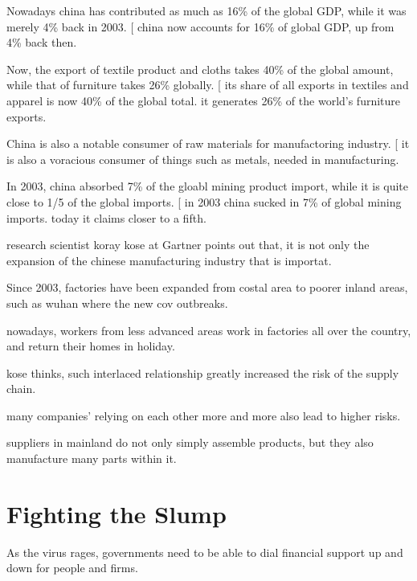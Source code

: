 \documentclass[a4paper,10pt]{article}
\begin{document}
{{{{{{{Nowadays china has contributed as much as 16\% of the global GDP, while it was merely 4\% back in 2003.
[
	china now accounts for 16\% of global GDP, up from 4\% back then.

Now, the export of textile product and cloths takes 40\% of the global amount, while that of furniture takes 26\% globally.
[
	its share of all exports in textiles and apparel is now 40\% of the global total.
	it generates 26\% of the world's furniture exports.

China is also a notable consumer of raw materials for manufactoring industry.
[
	it is also a voracious consumer of things such as metals, needed in manufacturing.

In 2003, china absorbed 7\% of the gloabl mining product import, while it is quite close to 1/5 of the global imports.
[
	in 2003 china sucked in 7\% of global mining imports. today it claims closer to a fifth.

%

research scientist koray kose at Gartner points out that, it is not only the expansion of the chinese manufacturing industry that is importat.

Since 2003, factories have been expanded from costal area to poorer inland areas, such as wuhan where the new cov outbreaks.

nowadays, workers from less advanced areas work in factories all over the country, and return their homes in holiday.

kose thinks, such interlaced relationship greatly increased the risk of the supply chain.

many companies' relying on each other more and more also lead to higher risks.

suppliers in mainland do not only simply assemble products, but they also manufacture many parts within it.

%

\section{Fighting the Slump}

As the virus rages, governments need to be able to dial financial support up and down for people and firms.

\begin{Parallel}{0.5\textwidth}{0.5\textwidth}
	\ParallelPar


\end{Parallel}}}}}}}}
\end{document}
